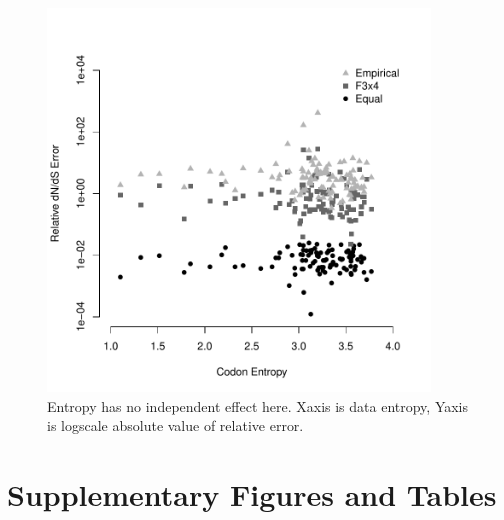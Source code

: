 \documentclass[11pt]{article}
\begin{document}
\bigskip
\begin{figure}[H]
\centerline{\includegraphics[width=4in]{figures/entropy_error_nobias.pdf}}
\caption{\label{entropyerror} Entropy has no independent effect here. Xaxis is data entropy, Yaxis is logscale absolute value of relative error.}
\end{figure}



\clearpage
\newpage

\section*{Supplementary Figures and Tables}
\end{document}
